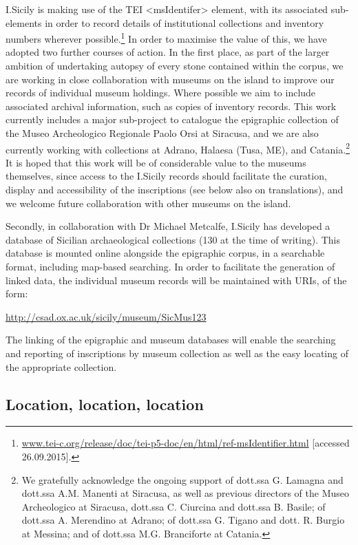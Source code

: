 \documentclass[amsthm,ebook]{saparticle}
\begin{document}
I.Sicily is making use of the TEI {\textless}msIdentifer{\textgreater} element, with its associated sub-elements in
order to record details of institutional collections and inventory numbers wherever possible.\footnote{\url{www.tei-c.org/release/doc/tei-p5-doc/en/html/ref-msIdentifier.html} [accessed 26.09.2015].} In order to maximise the
value of this, we have adopted two further courses of action. In the first place, as part of the larger ambition of
undertaking autopsy of every stone contained within the corpus, we are working in close collaboration with museums on
the island to improve our records of individual museum holdings. Where possible we aim to include associated archival
information, such as copies of inventory records. This work currently includes a major sub-project to catalogue the
epigraphic collection of the Museo Archeologico Regionale Paolo Orsi at Siracusa, and we are also currently working
with collections at Adrano, Halaesa (Tusa, ME), and Catania.\footnote{ We gratefully acknowledge the ongoing support of
dott.ssa G. Lamagna and dott.ssa A.M. Manenti at Siracusa, as well as previous directors of the Museo Archeologico at
Siracusa, dott.ssa C. Ciurcina and dott.ssa B. Basile; of dott.ssa A. Merendino at Adrano; of dott.ssa G. Tigano and
dott. R. Burgio at Messina; and of dott.ssa M.G. Branciforte at Catania.} It is hoped that this work will be of
considerable value to the museums themselves, since access to the I.Sicily records should facilitate the curation,
display and accessibility of the inscriptions (see below also on translations), and we welcome future collaboration
with other museums on the island.

Secondly, in collaboration with Dr Michael Metcalfe, I.Sicily has developed a database of Sicilian archaeological
collections (130 at the time of writing). This database is mounted online alongside the epigraphic corpus, in a
searchable format, including map-based searching. In order to facilitate the generation of linked data, the individual
museum records will be maintained with URIs, of the form:

\url{http://csad.ox.ac.uk/sicily/museum/SicMus123}

The linking of the epigraphic and museum databases will enable the searching and reporting of inscriptions by museum
collection as well as the easy locating of the appropriate collection.




\subsection{Location, location, location}
\end{document}
